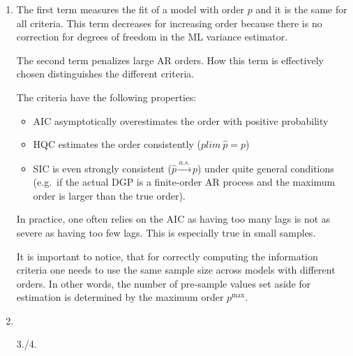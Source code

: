 \begin{enumerate}

\item
The first term measures the fit of a model with order \(p\) and it is the same for all criteria.
This term decreases for increasing order because there is no correction for degrees of freedom in the ML variance estimator.

The second term penalizes large AR orders.
How this term is effectively chosen distinguishes the different criteria.

The criteria have the following properties:
\begin{itemize}
  \item AIC asymptotically overestimates the order with positive probability
  \item HQC estimates the order consistently (\(plim~\hat{p}= p\))
  \item SIC is even strongly consistent (\(\hat{p} \overset{a.s.}{\rightarrow} p\)) under quite general conditions
        (e.g.\ if the actual DGP is a finite-order AR process and the maximum order is larger than the true order).
\end{itemize}
In practice, one often relies on the AIC as having too many lags is not as severe as having too few lags.
This is especially true in small samples.

It is important to notice, that for correctly computing the information criteria
  one needs to use the same sample size across models with different orders.
In other words, the number of pre-sample values set aside for estimation is determined by the maximum order \(p^{\text{max}}\).

\item


\item[3./4.]


\end{enumerate}